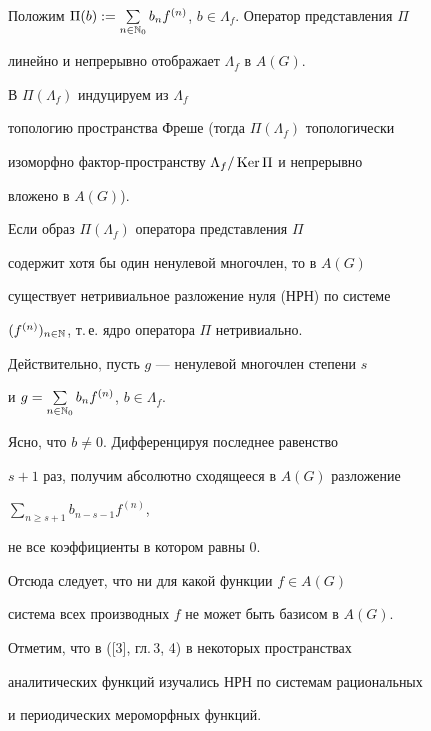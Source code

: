 Положим $\Pi(b):=\sum\limits_{n\in\Bbb N_0}


b_nf^{(n)}$, $b\in\Lambda_f$. Оператор представления $\Pi$


линейно и непрерывно отображает $\Lambda_f$ в $A(G)$.


В $\Pi(\Lambda_f)$ индуцируем из $\Lambda_f$


топологию пространства Фреше (тогда $\Pi(\Lambda_f)$ топологически


изоморфно фактор-пространству $\Lambda_f/\operatorname{Ker}\Pi$ и непрерывно


вложено в $A(G)$).





\begin{note}


Если образ $\Pi(\Lambda_f)$ оператора представления $\Pi$


содержит хотя бы один ненулевой многочлен, то в $A(G)$


существует нетривиальное разложение нуля (НРН) по системе


$(f^{(n)})_{n\in\Bbb N}$, т.\,е. ядро оператора $\Pi$ нетривиально.


\end{note}





Действительно, пусть $g$ --- ненулевой многочлен степени $s$


и $g=\sum\limits_{n\in\Bbb N_0}b_n f^{(n)}$, $b\in\Lambda_f$.


Ясно, что $b\ne0$. Дифференцируя последнее равенство


$s+1$ раз, получим абсолютно сходящееся в $A(G)$ разложение


$\sum\limits_{n\ge s+1}b_{n-s-1}f^{(n)}$,


не все коэффициенты в котором равны 0.





Отсюда следует, что ни для какой функции $f\in A(G)$


система всех производных $f$ не может быть базисом в $A(G)$.





Отметим, что в ([3], гл.\,3, 4) в некоторых пространствах


аналитических функций изучались НРН по системам рациональных


и периодических мероморфных функций.





